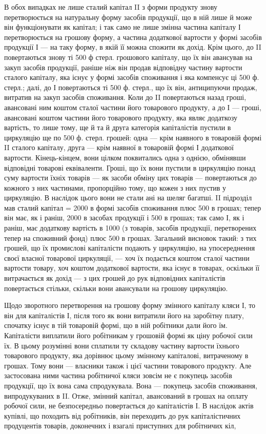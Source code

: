 В обох випадках не лише сталий капітал II з форми продукту знову
перетворюється на натуральну форму засобів продукції, що в ній лише
й може він функціонувати як капітал; і так само не лише змінна частина
капіталу І перетворюється на грошову форму, а частина додаткової вартости
у формі засобів продукції І — на таку форму, в якій її можна спожити
як дохід. Крім цього, до II повертаються знову ті 500 ф стерл. грошового
капіталу, що їх він авансував на закуп засобів продукції, раніше ніж він
продав відповідну частину вартости сталого капіталу, яка існує у формі
засобів споживання і яка компенсує ці 500 ф. стерл.; далі, до І повертаються
ті 500 ф. стерл., що їх він, антиципуючи продаж, витратив на
закуп засобів споживання. Коли до II повертаються назад гроші, авансовані
ним коштом сталої частини його товарового продукту, а до І — гроші,
авансовані коштом частини його товарового продукту, яка являє додаткозу
вартість, то лише тому, ще й та й друга категорія капіталістів пустили
в циркуляцію ще по 500 ф. стерл. грошей: одна — крім наявного
в товаровій формі II сталого капіталу, друга — крім наявної в товаровій
формі І додаткової вартости. Кінець-кінцем, вони цілком поквитались одна
з однією, обмінявши відповідні товарові еквіваленти. Гроші, що їх вони
пустили в циркуляцію понад суму вартости їхніх товарів — як засоби обміну
цих товарів — повертаються до кожного з них частинами, пропорційно
тому, що кожен з них пустив у циркуляцію. В наслідок цього вони не
стали ані на шеляг багатші. II підрозділ мав сталий капітал = 2000 в формі
засобів споживання плюс 500 в грошах; тепер він має, як і раніш, 2000
в засобах продукції і 500 в грошах; так само І, як і раніш, має додаткову
вартість в 1000 (з товарів, засобів продукції, перетворених тепер
на споживний фонд) плюс 500 в грошах. Загальний висновок такий:
з тих грошей, що їх промислові капіталісти подають у циркуляцію, на
упосереднення своєї власної товарової циркуляції, — хоч їх подається
коштом сталої частини вартости товару, хоч коштом додаткової вартости,
яка існує в товарах, оскільки її витрачається як дохід — з цих грошей до
рук відповідних капіталістів повертається стільки, скільки вони авансували
на грошову циркуляцію.

Щодо зворотного перетворення на грошову форму змінного капіталу
кляси І, то він для капіталістів І, після того як вони витратили його на
заробітну плату, спочатку існує в тій товаровій формі, що в ній робітники
дали його їм. Капіталісти виплатили його робітникам у грошовій
формі як ціну робочої сили їх. В цьому розумінні вони сплатили ту
складову частину вартости їхнього товарового продукту, яка дорівнює
цьому змінному капіталові, витраченому в грошах. Тому вони — власники також
і цієї частини товарового продукту. Але застосована ними частина робітничої
кляси зовсім не є покупець засобів продукції, що їх вона сама
спродукувала. Вона — покупець засобів споживання, випродукуваних в II.
Отже, змінний капітал, авансований в грошах на оплату робочої сили, не
безпосередньо повертається до капіталістів І. В наслідок актів купівлі,
що походить від робітників, він переходить до рук капіталістичних продуцентів
товарів, доконечних і взагалі приступних для робітничих кіл,
\parbreak{}  %
